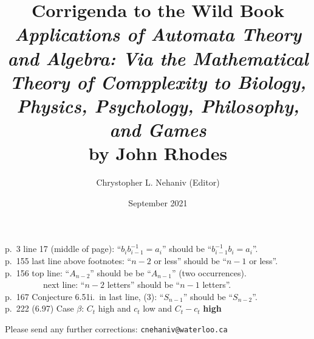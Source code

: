 \documentclass{article}
\title{Corrigenda to the Wild Book\\[1em]
{\em Applications of Automata Theory and Algebra: Via the Mathematical Theory of Compplexity to Biology, Physics, Psychology, Philosophy, and Games} \\[1em] by John Rhodes}
\author{Chrystopher L. Nehaniv (Editor)}
\date{September 2021}
\begin{document}
\maketitle



p.\ 3 line 17 (middle of page):   ``$b_i b_{i-1}^{-1}=a_i$'' should be ``$b_{i-1}^{-1} b_i=a_i$''. \\

p.\ 155 last line above footnotes:   ``$n-2$ or less'' should be ``$n-1$ or less''.\\

p.\ 156 top line: ``$A_{n-2}$'' should be be ``$A_{n-1}$'' (two occurrences).\\

\ \ \ \ \ \ \ \ \  next line:  ``$n-2$ letters'' should be ``$n-1$ letters''.\\
 
p.\ 167 Conjecture 6.51i.\ in last line,  (3):   ``$S_{n-1}$'' should be ``$S_{n-2}$''.  \\


p.\ 222 (6.97) Case $\beta$:  $C_t$ high and $c_t$ low and $C_t-c_t$ {\bf high}

\vfill
Please send any further corrections:  {\tt cnehaniv@waterloo.ca}
\end{document}
